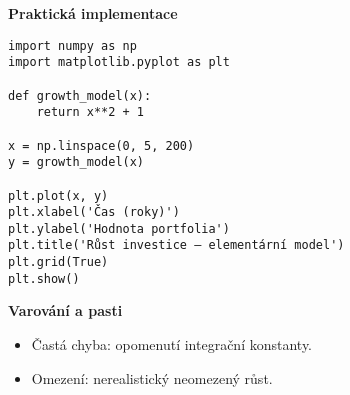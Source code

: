 \begin{example}
\textbf{Praktická implementace}
\begin{verbatim}
import numpy as np
import matplotlib.pyplot as plt

def growth_model(x):
    return x**2 + 1

x = np.linspace(0, 5, 200)
y = growth_model(x)

plt.plot(x, y)
plt.xlabel('Čas (roky)')
plt.ylabel('Hodnota portfolia')
plt.title('Růst investice – elementární model')
plt.grid(True)
plt.show()
\end{verbatim}

\textbf{Varování a pasti}
\begin{itemize}
\item Častá chyba: opomenutí integrační konstanty.
\item Omezení: nerealistický neomezený růst.
\end{itemize}
\end{example}

